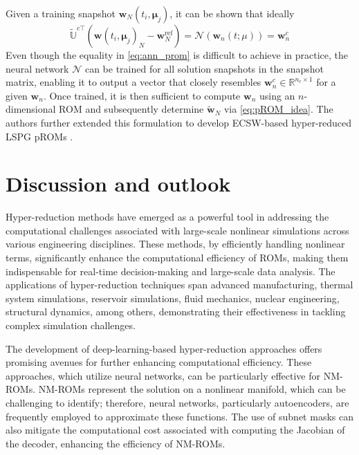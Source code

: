 \documentclass[11pt]{article}
\renewcommand{\vec}[1]{\mathbf{#1}}
\begin{document}
            Given a training snapshot \(\vec{w}_N(t_i,\boldsymbol{\mu}_j)\), it can be shown that ideally
            \begin{equation}
            \label{eq:ann_prom}
            \widetilde{\mathbb{U}}^{c\top} (\vec{w}(t_i,\boldsymbol{\mu}_j)_N-\mathbf{w}_N^{\text{ref}}) = \mathcal{N}(\vec{w}_n(t; \mu)) = \vec{w}^c_n
            \end{equation}
            Even though the equality in \cref{eq:ann_prom} is difficult to achieve in practice,
            the neural network \(\mathcal{N}\) can be trained for all solution snapshots in the snapshot matrix, enabling it to output a vector that closely resembles \(\vec{w}^c_n \in \mathbb{R}^{n_c \times 1}\) for a given \(\vec{w}_n\).
            Once trained, it is then sufficient to compute \(\vec{w}_n\) using an \(n\)-dimensional ROM and subsequently determine \(\widetilde{\vec{w}}_N\) via \cref{eq:pROM_idea}.
            The authors further extended this formulation to develop ECSW-based hyper-reduced LSPG pROMs \cite{barnett2023neural-network-augmenteda}.



            \section{Discussion and outlook}
            Hyper-reduction methods have emerged as a powerful tool in addressing the computational challenges associated with large-scale nonlinear simulations across various engineering disciplines.
            These methods, by efficiently handling nonlinear terms, significantly enhance the computational efficiency of ROMs, making them indispensable for real-time decision-making and large-scale data analysis.
            The applications of hyper-reduction techniques span advanced manufacturing, thermal system simulations, reservoir simulations, fluid mechanics, nuclear engineering, structural dynamics, among others, demonstrating their effectiveness in tackling complex simulation challenges.

            The development of deep-learning-based hyper-reduction approaches offers promising avenues for further enhancing computational efficiency.
            These approaches, which utilize neural networks, can be particularly effective for NM-ROMs.
            NM-ROMs represent the solution on a nonlinear manifold, which can be challenging to identify; therefore, neural networks, particularly autoencoders, are frequently employed to approximate these functions.
            The use of subnet masks can also mitigate the computational cost associated with computing the Jacobian of the decoder, enhancing the efficiency of NM-ROMs.
\end{document}
